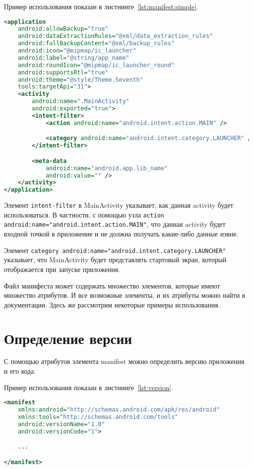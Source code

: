 Пример использования показан в листнинге~\ref{lst:manifest:simple}.

\begin{lstlisting}[language=XML
	, caption=\leftline{}
	, label=lst:manifest:simple
	]
<application
	android:allowBackup="true"
	android:dataExtractionRules="@xml/data_extraction_rules"
	android:fullBackupContent="@xml/backup_rules"
	android:icon="@mipmap/ic_launcher"
	android:label="@string/app_name"
	android:roundIcon="@mipmap/ic_launcher_round"
	android:supportsRtl="true"
	android:theme="@style/Theme.Seventh"
	tools:targetApi="31">
	<activity
		android:name=".MainActivity"
		android:exported="true">
		<intent-filter>
			<action android:name="android.intent.action.MAIN" />

			<category android:name="android.intent.category.LAUNCHER" />
		</intent-filter>

		<meta-data
			android:name="android.app.lib_name"
			android:value="" />
	</activity>
</application>
\end{lstlisting}

Элемент \texttt{intent-filter} в MainActivity указывает,
как данная activity будет использоваться. В частности, с помощью узла
\texttt{action android:name="android.intent.action.MAIN"},
что данная activity будет
входной точкой в приложение и не должна получать какие-либо данные извне.\par
Элемент \texttt{category android:name="android.intent.category.LAUNCHER"}
указывает, что MainActivity будет представлять стартовый экран, который
отображается при запуске приложения.\par
Файл манифеста может содержать множество элементов, которые имеют
множество атрибутов. И все возможные элементы, и их атрибуты можно
найти в документации. Здесь же рассмотрим некоторые примеры
использования.

\section{Определение версии}
С помощью атрибутов элемента manifest можно определить версию
приложения и его кода.\par
Пример использования показан в листнинге~\ref{lst:version}.

\begin{lstlisting}[language=XML
	, caption=\leftline{}
	, label=lst:version
	]
<manifest
    xmlns:android="http://schemas.android.com/apk/res/android"
    xmlns:tools="http://schemas.android.com/tools"
    android:versionName="1.0"
    android:versionCode="1">

	...

</manifest>
\end{lstlisting}

